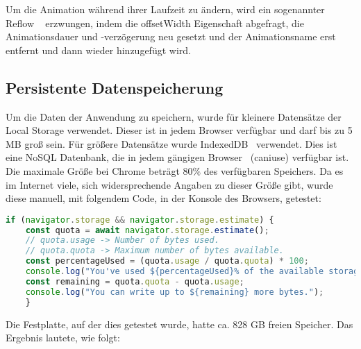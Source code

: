 \newline
\newline
Um die Animation während ihrer Laufzeit zu ändern, wird ein sogenannter Reflow ~\cite{JavaScriptAnimationsReflow} erzwungen, indem die offsetWidth Eigenschaft abgefragt, die Animationsdauer und -verzögerung neu gesetzt und der Animationsname erst entfernt und dann wieder hinzugefügt wird.
\newline
\newline
\subsection{Persistente Datenspeicherung}\label{subsec:persistente-datenspeicherung}
Um die Daten der Anwendung zu speichern, wurde für kleinere Datensätze der Local Storage verwendet.
Dieser ist in jedem Browser verfügbar und darf bis zu 5 MB groß sein.
\newline
\newline
Für größere Datensätze wurde IndexedDB~\cite{IndexedDB} verwendet.
Dies ist eine NoSQL Datenbank, die in jedem gängigen Browser~\cite{caniuse-indexedDB} (\gls{caniuse}) verfügbar ist.
Die maximale Größe bei Chrome beträgt 80\(\%\) des verfügbaren Speichers.
Da es im Internet viele, sich widersprechende Angaben zu dieser Größe gibt, wurde diese manuell, mit folgendem Code, in der Konsole des Browsers, getestet:
\newline
\newline
\begin{lstlisting}[language=JavaScript,label={lst:JavaScript IndexedDB Speichergröße}]
    if (navigator.storage && navigator.storage.estimate) {
    const quota = await navigator.storage.estimate();
    // quota.usage -> Number of bytes used.
    // quota.quota -> Maximum number of bytes available.
    const percentageUsed = (quota.usage / quota.quota) * 100;
    console.log("You've used ${percentageUsed}% of the available storage.");
    const remaining = quota.quota - quota.usage;
    console.log("You can write up to ${remaining} more bytes.");
    }
\end{lstlisting}
\newline
\newline
Die Festplatte, auf der dies getestet wurde, hatte ca. 828 GB freien Speicher.
Das Ergebnis lautete, wie folgt:
\newline
